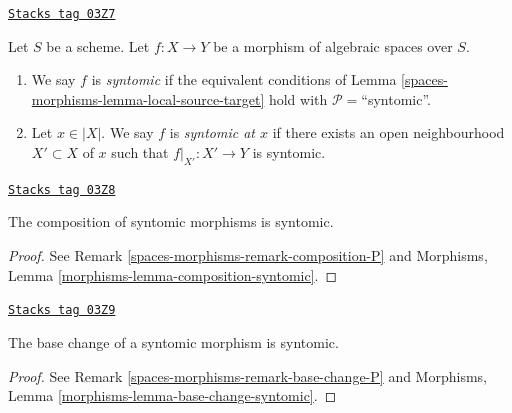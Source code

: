 \begin{definition}[Syntomic]
\label{spaces-morphisms-definition-syntomic}
\href{https://stacks.math.columbia.edu/tag/03Z7}{\texttt{Stacks tag 03Z7}}

Let $S$ be a scheme.
Let $f : X \to Y$ be a morphism of algebraic spaces over $S$.
\begin{enumerate}
\item We say $f$ is {\it syntomic} if the equivalent conditions of
Lemma \ref{spaces-morphisms-lemma-local-source-target}
hold with $\mathcal{P} =$``syntomic''.
\item Let $x \in |X|$. We say $f$ is {\it syntomic at $x$} if
there exists an open neighbourhood $X' \subset X$ of $x$ such
that $f|_{X'} : X' \to Y$ is syntomic.
\end{enumerate}
\end{definition}

\begin{lemma}
\label{spaces-morphisms-lemma-composition-syntomic}
\href{https://stacks.math.columbia.edu/tag/03Z8}{\texttt{Stacks tag 03Z8}}

The composition of syntomic morphisms is syntomic.
\end{lemma}

\begin{proof}
See Remark \ref{spaces-morphisms-remark-composition-P} and
Morphisms, Lemma \ref{morphisms-lemma-composition-syntomic}.
\end{proof}

\begin{lemma}
\label{spaces-morphisms-lemma-base-change-syntomic}
\href{https://stacks.math.columbia.edu/tag/03Z9}{\texttt{Stacks tag 03Z9}}

The base change of a syntomic morphism is syntomic.
\end{lemma}

\begin{proof}
See Remark \ref{spaces-morphisms-remark-base-change-P} and
Morphisms, Lemma \ref{morphisms-lemma-base-change-syntomic}.
\end{proof}


